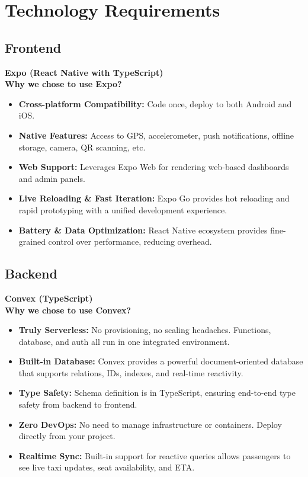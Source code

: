 \documentclass[a4paper,12pt]{article}
\begin{document}
\section{Technology Requirements}

\subsection{Frontend}
\textbf{Expo (React Native with TypeScript)}\\
\textbf{Why we chose to use Expo?}
\begin{itemize}
    \item \textbf{Cross-platform Compatibility:} Code once, deploy to both Android and iOS.
    \item \textbf{Native Features:} Access to GPS, accelerometer, push notifications, offline storage, camera, QR scanning, etc.
    \item \textbf{Web Support:} Leverages Expo Web for rendering web-based dashboards and admin panels.
    \item \textbf{Live Reloading \& Fast Iteration:} Expo Go provides hot reloading and rapid prototyping with a unified development experience.
    \item \textbf{Battery \& Data Optimization:} React Native ecosystem provides fine-grained control over performance, reducing overhead.
\end{itemize}

\subsection{Backend}
\textbf{Convex (TypeScript)}\\
\textbf{Why we chose to use Convex?}
\begin{itemize}
    \item \textbf{Truly Serverless:} No provisioning, no scaling headaches. Functions, database, and auth all run in one integrated environment.
    \item \textbf{Built-in Database:} Convex provides a powerful document-oriented database that supports relations, IDs, indexes, and real-time reactivity.
    \item \textbf{Type Safety:} Schema definition is in TypeScript, ensuring end-to-end type safety from backend to frontend.
    \item \textbf{Zero DevOps:} No need to manage infrastructure or containers. Deploy directly from your project.
    \item \textbf{Realtime Sync:} Built-in support for reactive queries allows passengers to see live taxi updates, seat availability, and ETA.
\end{itemize}
\end{document}
